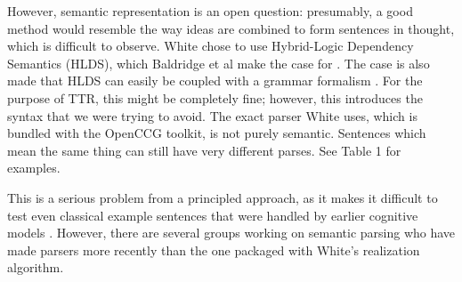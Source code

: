 \documentclass[11pt]{article}
\begin{document}
However, semantic representation is an open question: presumably, a good method would resemble the way ideas are combined to form sentences in thought, which is difficult to observe. White chose to use Hybrid-Logic Dependency Semantics (HLDS), which Baldridge et al make the case for \cite{hlds1}. The case is also made that HLDS can easily be coupled with a grammar formalism \cite{hlds}. For the purpose of TTR, this might be completely fine; however, this introduces the syntax that we were trying to avoid. The exact parser White uses, which is bundled with the OpenCCG toolkit, is not purely semantic. Sentences which mean the same thing can still have very different parses. See Table 1 for examples.

This is a serious problem from a principled approach, as it makes it difficult to test even classical example sentences that were handled by earlier cognitive models \cite{reitter2011syntacticpriming}. However, there are several groups working on semantic parsing who have made parsers more recently than the one packaged with White's realization algorithm.
\end{document}
